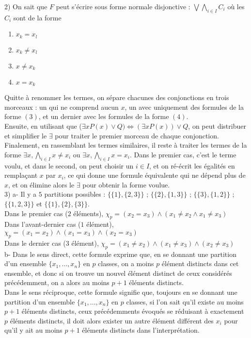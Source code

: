 \documentclass[11pt,a4paper]{article}
\begin{document}
2) On sait que $F$ peut s'écrire sous forme normale disjonctive : $\displaystyle \bigvee \bigwedge_{i \in I} C_i $ où les $C_i$ sont de la forme 
\begin{enumerate}
\item $x_k=x_l$
\item $x_k\neq x_l$
\item $x\neq x_k$
\item $x=x_k$
\end{enumerate}
Quitte à renommer les termes, on sépare chacunes des conjonctions en trois morceaux : un qui ne comprend aucun $x$, un avec uniquement des formules de la forme $(3)$, et un dernier avec les formules de la forme $(4)$. \\ 
Ensuite, en utilisant que ($\exists x P(x) \lor Q) \Leftrightarrow (\exists x P(x))\lor Q$, on peut distribuer et simplifier le $\exists$ pour traiter le premier morceau de chaque conjonction. \\
 Finalement, en rassemblant les termes similaires,  il reste à traiter les termes de la forme $\exists x, \bigwedge_{i \in I} x\neq x_i$ ou $\exists x, \bigwedge_{i \in I} x= x_i$. Dans le premier cas, c'est le terme voulu, et dans le second, on peut choisir un $i\in I$, et on ré-écrit les égalités en remplaçant $x$ par $x_i$, ce qui donne une formule équivalente qui ne dépend plus de $x$, et on élimine alors le $\exists$ pour obtenir la forme voulue. \\
 
 3) a- Il y a $5$ partitions possibles : $\{\{1\},\{2,3\}\}$ ; $\{\{2\},\{1,3\}\}$ ; $\{\{3\},\{1,2\}\}$ ; $\{\{1,2,3\}\}$ et $\{\{1\},\{2\},\{3\}\}$. \\
Dans le premier cas ($2$ éléments), $\chi_p = (x_2 = x_3)\land (x_1 \neq x_2 \land x_1 \neq x_3)$ \\
Dans l'avant-dernier cas ($1$ élément), $\chi_p = (x_1 = x_2)\land(x_1=x_3)\land(x_2=x_3)$\\
Dans le dernier cas ($3$ élément), $\chi_p = (x_1 \neq x_2)\land(x_1 \neq x_3)\land(x_2 \neq x_3)$\\

b- Dans le sens direct, cette formule exprime que, en se donnant une partition d'un ensemble $\{x_1,\dots,x_n\}$ en $p$ classes, on a moins $p$ élément distincts dans cet ensemble, et donc si on trouve un nouvel élément distinct de ceux considérés précédemment, on a alors au moins $p+1$ éléments distincts. \\
Dans le sens réciproque, cette formule signifie que, toujours en se donnant une partition d'un ensemble $\{x_1,\dots,x_n\}$ en $p$ classes, si l'on sait qu'il existe au moins $p+1$ éléments distincts, ceux précédemments évoqués se réduisant à exactement $p$ éléments distincts, il doit alors exister un autre élément différent des $x_i$ pour qu'il y ait au moins $p+1$ éléments distincts dans l'interprétation.  \\
\end{document}
